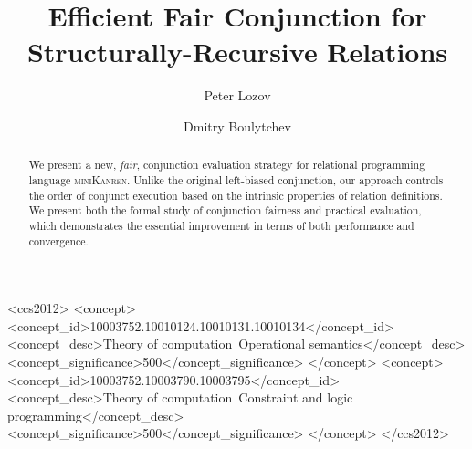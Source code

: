 \documentclass[sigplan,screen]{acmart}
\newcommand{\mk}{\textsc{miniKanren}\xspace}
\begin{document}
\title{Efficient Fair Conjunction for\\
  Structurally-Recursive Relations}

\author{Peter Lozov}
\author{Dmitry Boulytchev}
\renewcommand{\shortauthors}{Lozov and Boulytchev}

\begin{abstract}
  We present a new, \emph{fair}, conjunction evaluation strategy for relational programming language \mk. Unlike the original left-biased
  conjunction, our approach controls the order of conjunct execution based on the intrinsic properties of relation definitions.
  We present both the formal study of conjunction fairness and practical evaluation, which demonstrates the essential
  improvement in terms of both performance and convergence.
\end{abstract}

\begin{CCSXML}
<ccs2012>
<concept>
<concept_id>10003752.10010124.10010131.10010134</concept_id>
<concept_desc>Theory of computation~Operational semantics</concept_desc>
<concept_significance>500</concept_significance>
</concept>
<concept>
<concept_id>10003752.10003790.10003795</concept_id>
<concept_desc>Theory of computation~Constraint and logic programming</concept_desc>
<concept_significance>500</concept_significance>
</concept>
</ccs2012>
\end{CCSXML}
\end{document}
